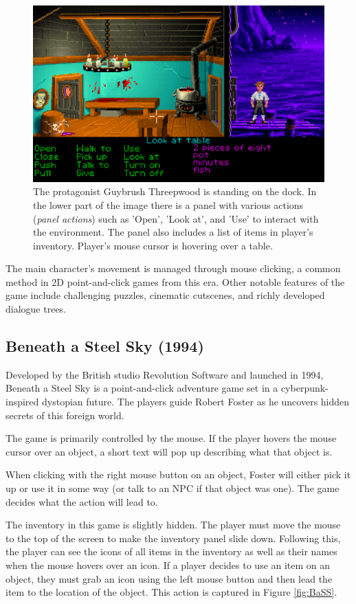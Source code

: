 \begin{figure}[H]
\centering
\includegraphics[width=1.\linewidth]{img/TSoMI.png}
\caption{The protagonist Guybrush Threepwood is standing on the dock. In the lower part of the image there is a panel with various actions (\textit{panel actions}) such as 'Open', 'Look at', and 'Use' to interact with the environment. The  panel also includes a list of items in player's inventory. Player's mouse cursor is hovering over a table.}
\label{fig:TSoMI}
\end{figure}
The main character's movement is managed through mouse clicking, a common method in 2D point-and-click games from this era. Other notable features of the game include challenging puzzles, cinematic cutscenes, and richly developed dialogue trees.

\subsection{Beneath a Steel Sky (1994)}
Developed by the British studio Revolution Software and launched in 1994, Beneath a Steel Sky is a point-and-click adventure game set in a cyberpunk-inspired dystopian future. The players guide Robert Foster as he uncovers hidden secrets of this foreign world.

The game is primarily controlled by the mouse. If the player hovers the mouse cursor over an object, a short text will pop up describing what that object is.

When clicking with the right mouse button on an object, Foster will either pick it up or use it in some way (or talk to an NPC if that object was one). The game decides what the action will lead to.

The inventory in this game is slightly hidden. The player must move the mouse to the top of the screen to make the inventory panel slide down. Following this, the player can see the icons of all items in the inventory as well as their names when the mouse hovers  over an icon. If a player decides to use an item on an object, they must grab an icon using the left mouse button and then lead the item to the location of the object. This action is captured in Figure \ref{fig:BaSS}.


